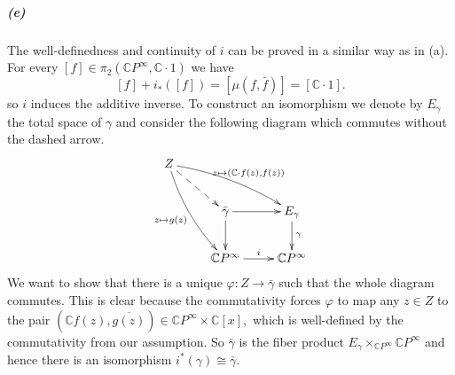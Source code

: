 \documentclass{article}
\begin{document}
\subparagraph{(e)}The well-definedness and continuity of $i$ can be proved in a similar way as in (a). For every $[f]\in\pi_2(\mathbb{C}P^{\infty},\mathbb{C}\cdot1)$ we have
\[[f]+i_*([f])=[\mu(f,\bar{f})]=[\mathbb{C}\cdot1].\]
so $i$ induces the additive inverse. To construct an isomorphism we denote by $E_\gamma$ the total space of $\gamma$ and consider the following diagram which commutes without the dashed arrow.
\[\xymatrix{
Z\ar@/^/[drr]^{z\mapsto(\mathbb{C}\cdot f(z),f(z))}\ar@/_/[ddr]_{z\mapsto g(z)}\ar@{-->}[dr] & &\\
& \bar{\gamma}\ar[r]\ar[d] & E_\gamma\ar[d]^{\gamma}\\
& \mathbb{C}P^{\infty}\ar[r]^i & \mathbb{C}P^{\infty}}\]
We want to show that there is a unique $\varphi\colon Z\rightarrow\bar{\gamma}$ such that the whole diagram commutes. This is clear because the commutativity forces $\varphi$ to map any $z\in Z$ to the pair $(\mathbb{C}f(z),\overline{g(z)})\in\mathbb{C}P^{\infty}\times\mathbb{C}[x],$ which is well-defined by the commutativity from our assumption. So $\bar{\gamma}$ is the fiber product $E_\gamma\times_{\mathbb{C}P^{\infty}}\mathbb{C}P^{\infty}$ and hence there is an isomorphism $i^*(\gamma)\cong\bar{\gamma}.$
\end{document}
